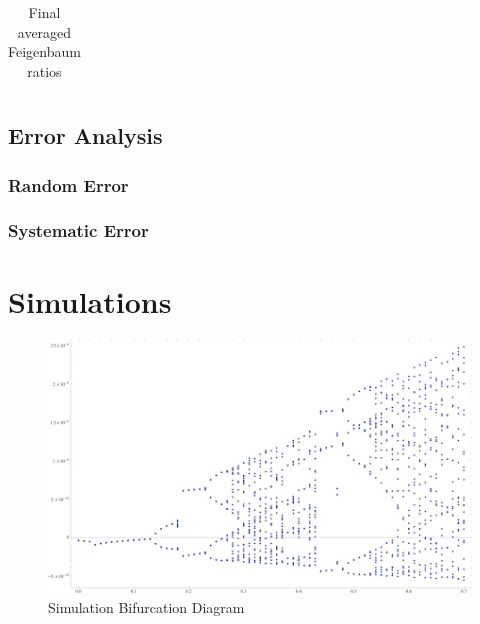 \documentclass[12pt]{report}
\begin{document}

	
	\begin{table}[h]
		\centering
		\begin{tabular}{|c|c|c|c|c|}
			\hline
			 
		\end{tabular}
		\caption{Final averaged Feigenbaum ratios}
		\label{tab:feigenbaum}
		
	\end{table}
	



\section{Error Analysis} %
\label{sec:Error Analysis}

\subsection{Random Error}
\label{subsec:RandomError}


\subsection{Systematic Error}
\label{subsec: Systematic Error}



\chapter{Simulations} %
\label{ch:Simulations}



	\begin{figure}[h]
		\centering
		\includegraphics{simulations/circuit.png}
		\caption{Simulation Bifurcation Diagram}
		\label{fig: Simulation Bifurcation Diagram}
	\end{figure}
\end{document}
